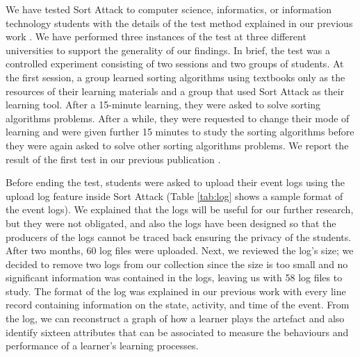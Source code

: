 \documentclass[conference]{IEEEtran}
\begin{document}
We have tested Sort Attack to computer science, informatics, or information technology students with the details of the test method explained in our previous work \cite{yohannis2015sort}. We have performed three instances of the test at three different universities to support the generality of our findings. In brief, the test was a controlled experiment consisting of two sessions and two groups of students. At the first session, a group learned sorting algorithms using textbooks only as the resources of their learning materials and a group that used Sort Attack as their learning tool. After a 15-minute learning, they were asked to solve sorting algorithms problems. After a while, they were requested to change their mode of learning and were given further 15 minutes to study the sorting algorithms before they were again asked to solve other sorting algorithms problems. We report the result of the first test in our previous publication \cite{yohannis2015sort}.

Before ending the test, students were asked to upload their event logs using the upload log feature inside Sort Attack (Table \ref{tab:log} shows a sample format of the event logs). We explained that the logs will be useful for our further research, but they were not obligated, and also the logs have been designed so that the producers of the logs cannot be traced back ensuring the privacy of the students. After two months, 60 log files were uploaded. Next, we reviewed the log’s size; we decided to remove two logs from our collection since the size is too small and no significant information was contained in the logs, leaving us with 58 log files to study. The format of the log was explained in our previous work \cite{yohannis2015visualization} with every line record containing information on the state, activity, and time of the event. From the log, we can reconstruct a graph of how a learner plays the artefact and also  identify sixteen attributes that can be associated to measure the behaviours and performance of a learner’s learning processes. 
\end{document}
